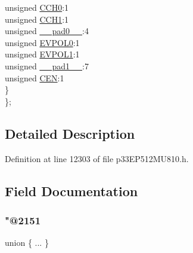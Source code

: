 \begin{DoxyCompactItemize}
\begin{tabbing}
\>\>unsigned \hyperlink{structtag_c_m1_c_o_n_b_i_t_s_a9dad61251c4da1feccdccad790f76a62}{CCH0}:1\\
\>\>unsigned \hyperlink{structtag_c_m1_c_o_n_b_i_t_s_a7753603d75b7b22f224e8bd9325a0d15}{CCH1}:1\\
\>\>unsigned \hyperlink{structtag_c_m1_c_o_n_b_i_t_s_adf71f3d8410c1f1dbbc96680a92c49af}{\_\_pad0\_\_}:4\\
\>\>unsigned \hyperlink{structtag_c_m1_c_o_n_b_i_t_s_ab8a5977706a1608b0e9a1a91b9d3b3e3}{EVPOL0}:1\\
\>\>unsigned \hyperlink{structtag_c_m1_c_o_n_b_i_t_s_a0254aea1902c8c590f6753fefd1d8875}{EVPOL1}:1\\
\>\>unsigned \hyperlink{structtag_c_m1_c_o_n_b_i_t_s_acaf2d0924a107ec6e8d2e31febaf66f9}{\_\_pad1\_\_}:7\\
\>\>unsigned \hyperlink{structtag_c_m1_c_o_n_b_i_t_s_ac2fcf3da30303e5fdf269436a0fa4505}{CEN}:1\\
\>\} \\
\}; \\

\end{tabbing}\end{DoxyCompactItemize}


\subsection{Detailed Description}


Definition at line 12303 of file p33\+E\+P512\+M\+U810.\+h.



\subsection{Field Documentation}
\mbox{\label{structtag_c_m1_c_o_n_b_i_t_s_a69dbe2fc2076bf0fc4bd74c5780d2833}} 
\subsubsection{\texorpdfstring{"@2151}{@2151}}
{\footnotesize\ttfamily union \{ ... \} }

\mbox{\label{structtag_c_m1_c_o_n_b_i_t_s_adf71f3d8410c1f1dbbc96680a92c49af}} 

